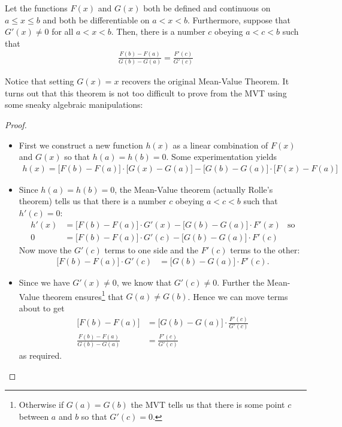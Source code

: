 \begin{theorem}\label{thm:GMVT}
Let the functions $F(x)$ and $G(x)$ both be defined and continuous on
$a\le x\le b$ and both be differentiable on $a<x<b$. Furthermore, suppose
that $G'(x)\ne 0$ for all $a<x<b$.
Then, there is a number $c$ obeying $a<c<b$ such that
\begin{align*}
\frac{F(b)-F(a)}{G(b)-G(a)}=\frac{F'(c)}{G'(c)}
\end{align*}
\end{theorem}
Notice that setting $G(x) = x$ recovers the original Mean-Value Theorem. It turns out
that this theorem is not too difficult to prove from the MVT using some sneaky algebraic
manipulations:
\begin{proof}
\begin{itemize}
 \item First we construct a new function $h(x)$ as a linear combination of $F(x)$ and
  $G(x)$ so that $h(a)=h(b)=0$. Some experimentation yields
  \begin{align*}
  h(x)=\big[F(b)-F(a)\big]\cdot \big[G(x)-G(a)\big]-
  \big[G(b)-G(a)\big] \cdot \big[F(x)-F(a)\big]
  \end{align*}
 \item Since $h(a)=h(b)=0$, the Mean-Value theorem (actually Rolle's theorem) tells us
that there is a number $c$ obeying $a<c<b$ such that $h'(c)=0$:
\begin{align*}
  h'(x) &= \big[F(b)-F(a)\big] \cdot G'(x) - \big[G(b)-G(a)\big] \cdot F'(x) & \text{
so}\\
  0 &= \big[F(b)-F(a)\big] \cdot G'(c) - \big[G(b)-G(a)\big] \cdot F'(c)
\end{align*}
Now move the $G'(c)$ terms to one side and the $F'(c)$ terms to the other:
\begin{align*}
  \big[F(b)-F(a)\big] \cdot G'(c) &= \big[G(b)-G(a)\big] \cdot F'(c).
\end{align*}
\item Since we have $G'(x) \neq 0$, we know that $G'(c) \neq 0$. Further the Mean-Value
theorem ensures\footnote{Otherwise if $G(a)=G(b)$ the MVT tells us that there is some
point $c$ between $a$ and $b$ so that $G'(c)=0$.} that $G(a) \neq G(b)$. Hence we can
move terms about to get
\begin{align*}
  \big[F(b)-F(a)\big] &= \big[G(b)-G(a)\big] \cdot \frac{F'(c)}{G'(c)} \\
  \frac{F(b)-F(a)}{G(b)-G(a)} &=  \frac{F'(c)}{G'(c)}
\end{align*}
as required.
\end{itemize}

\end{proof}

